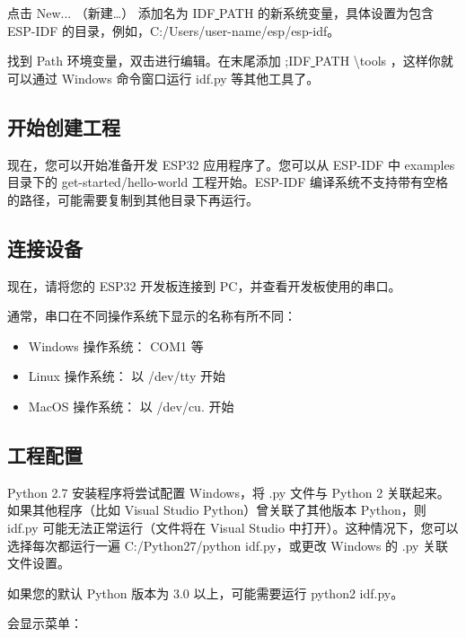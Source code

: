 点击 New... （新建…） 添加名为 IDF\underline{ }PATH 的新系统变量，具体设置为包含 ESP-IDF 的目录，例如，C:/Users/user-name/esp/esp-idf。

找到 Path 环境变量，双击进行编辑。在末尾添加 ;IDF\underline{ }PATH \backslash tools ，这样你就可以通过 Windows 命令窗口运行 idf.py 等其他工具了。

\subsection{开始创建工程}

现在，您可以开始准备开发 ESP32 应用程序了。您可以从 ESP-IDF 中 examples 目录下的 get-started/hello-world 工程开始。ESP-IDF 编译系统不支持带有空格的路径，可能需要复制到其他目录下再运行。

\subsection{连接设备}

现在，请将您的 ESP32 开发板连接到 PC，并查看开发板使用的串口。

通常，串口在不同操作系统下显示的名称有所不同：

\begin{itemize}
    \item Windows 操作系统： COM1 等
    \item Linux 操作系统： 以 /dev/tty 开始
    \item MacOS 操作系统： 以 /dev/cu. 开始
\end{itemize}


\subsection{工程配置}

Python 2.7 安装程序将尝试配置 Windows，将 .py 文件与 Python 2 关联起来。如果其他程序（比如 Visual Studio Python）曾关联了其他版本 Python，则 idf.py 可能无法正常运行（文件将在 Visual Studio 中打开）。这种情况下，您可以选择每次都运行一遍 C:/Python27/python idf.py，或更改 Windows 的 .py 关联文件设置。

如果您的默认 Python 版本为 3.0 以上，可能需要运行 python2 idf.py。

会显示菜单：